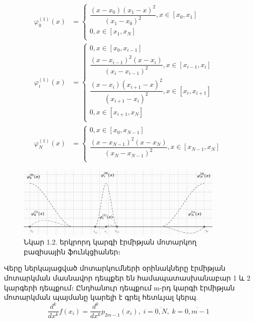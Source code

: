 \documentclass[fleqn, bachelor,subf,12pt,notitlepage]{article}
\begin{document}
\begin{equation}
\begin{aligned}
\varphi^{(1)}_{0}\left(x\right)&=\begin{cases}
\dfrac{\left(x-x_{0}\right)\left(x_{1}-x\right)^{2}}{\left(x_{1}-x_{0}\right)^{2}}, x\in \left[x_{0}, x_{1}\right]\\
0, x\in \left[x_{1}, x_{N}\right]\\
\end{cases}\\
\varphi^{(1)}_{i}\left(x\right)&=\begin{cases}
0, x\in \left[x_{0}, x_{i-1}\right]\\
\dfrac{\left(x-x_{i-1}\right)^2\left(x-x_{i}\right)}{\left(x_{i}-x_{i-1}\right)^{2}}, x\in \left[x_{i-1}, x_{i}\right]\\
\dfrac{\left(x-x_{i}\right)\left(x_{i+1}-x\right)^{2}}{\left(x_{i+1}-x_{i}\right)^{2}}, x\in \left[x_{i}, x_{i+1}\right]\\
0, x\in \left[x_{i+1}, x_{N}\right]\\
\end{cases}\\
\varphi^{(1)}_{N}\left(x\right)&=\begin{cases}
0, x\in \left[x_{0}, x_{N-1}\right]\\
\dfrac{\left(x-x_{N-1}\right)^{2}\left(x-x_{N}\right)}{\left(x_{N}-x_{N-1}\right)^{2}}, x\in \left[x_{N-1}, x_{N}\right]\\
\end{cases}
\end{aligned}
\end{equation}

\begin{figure}[h]
\centering
\includegraphics[width=0.9\textwidth]{images/one_var_quadratic}
\captionsetup{labelformat=empty}
\caption{Նկար 1.2. երկրորդ կարգի էրմիթյան մոտարկող բազիսային ֆունկցիաներ։}
\end{figure}
Վերը ներկայացված մոտարկումների օրինակները էրմիթյան մոտարկման մասնավոր դեպքեր են համապատասխանաբար 1 և 2 կարգերի դեպքում։
Ընդհանուր դեպքում m-րդ կարգի էրմիթյան մոտարկման պայմանը կարելի է գրել հետևյալ կերպ.
\begin{equation}
\dfrac{d^{k}}{dx^{k}}f\left(x_{i}\right)=\dfrac{d^{k}}{dx^{k}}p_{2m-1}\left(x_{i}\right), \;  i=\overline{0, N}, \;  k=\overline{0, m-1}
\end{equation}
\newpage
\end{document}
